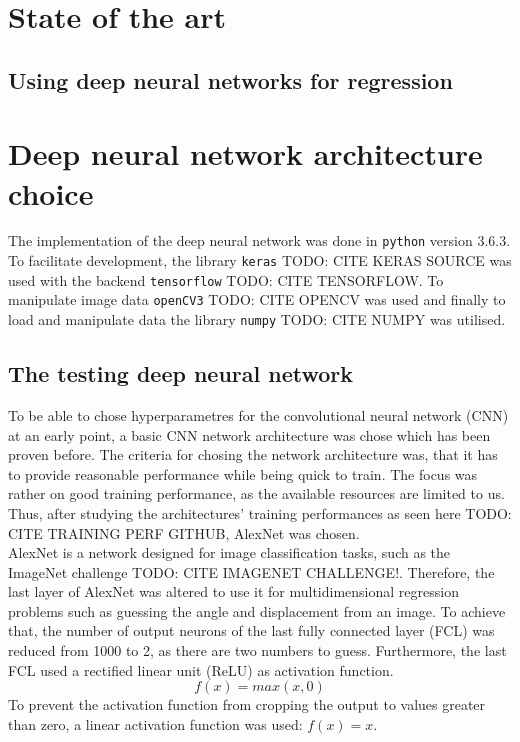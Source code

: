 \documentclass[10pt,a4paper,twoside,journal]{IEEEtran}
\begin{document}

\section{State of the art}
\label{sc:sota}
\the\textwidth

\subsection{Using deep neural networks for regression}

\section{Deep neural network architecture choice}
The implementation of the deep neural network was done in \texttt{python} version 3.6.3. To facilitate development, the library \texttt{keras} TODO: CITE KERAS SOURCE was used with the backend \texttt{tensorflow} TODO: CITE TENSORFLOW. To manipulate image data \texttt{openCV3} TODO: CITE OPENCV was used and finally to load and manipulate data the library \texttt{numpy} TODO: CITE NUMPY was utilised. 
\subsection{The testing deep neural network}
\label{ssc:testing-dnn}
To be able to chose hyperparametres for the convolutional neural network (CNN) at an early point, a basic CNN network architecture was chose which has been proven before. The criteria for chosing the network architecture was, that it has to provide reasonable performance while being quick to train. The focus was rather on good training performance, as the available resources are limited to us. Thus, after studying the architectures' training performances as seen here TODO: CITE TRAINING PERF GITHUB, AlexNet \cite{alexnet2012imagenet} was chosen.\\
AlexNet is a network designed for image classification tasks, such as the ImageNet challenge TODO: CITE IMAGENET CHALLENGE!. Therefore, the last layer of AlexNet was altered to use it for multidimensional regression problems such as guessing the angle and displacement from an image. To achieve that, the number of output neurons of the last fully connected layer (FCL) was reduced from 1000 to 2, as there are two numbers to guess. Furthermore, the last FCL used a rectified linear unit (ReLU) as activation function. 
\begin{equation}
	f(x) = max(x, 0)
\end{equation}
To prevent the activation function from cropping the output to values greater than zero, a linear activation function was used: $ f(x) = x $.
\end{document}
